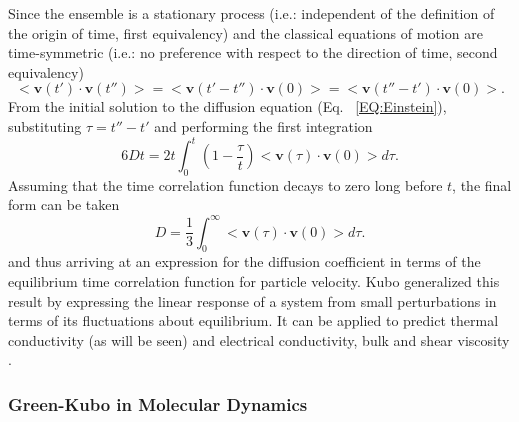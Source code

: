 %
Since the ensemble is a stationary process (i.e.: independent of the definition of the origin of time, first equivalency) and the classical equations of motion are time-symmetric (i.e.: no preference with respect to the direction of time, second equivalency)
%
\begin{equation}
<\bm{v}(t')\cdot\bm{v}(t'')>=<\bm{v}(t'-t'')\cdot\bm{v}(0)>=<\bm{v}(t''-t')\cdot\bm{v}(0)>.
\end{equation}
%
From the initial solution to the diffusion equation (Eq. ~\ref{EQ:Einstein}), substituting $\tau=t''-t'$ and performing the first integration
%
\begin{equation}
6Dt=2t\int_0^t\left(1-\frac{\tau}{t}\right)<\bm{v}(\tau)\cdot\bm{v}(0)>d\tau.
\end{equation}
%
Assuming that the time correlation function decays to zero long before $t$, the final form can be taken
%
\begin{equation}
D=\frac{1}{3}\int_0^{\infty}<\bm{v}(\tau)\cdot\bm{v}(0)>d\tau.
\end{equation}
%
and thus arriving at an expression for the diffusion coefficient in terms of the equilibrium time correlation function for particle velocity. Kubo generalized this result by expressing the linear response of a system from small perturbations in terms of its fluctuations about equilibrium. It can be applied to predict thermal conductivity (as will be seen)\cite{PhysRevB.61.2651} and electrical conductivity, \cite{zwanzig1965time} bulk and shear viscosity \cite{hoover1980lennard}.

\subsubsection {Green-Kubo in Molecular Dynamics}

